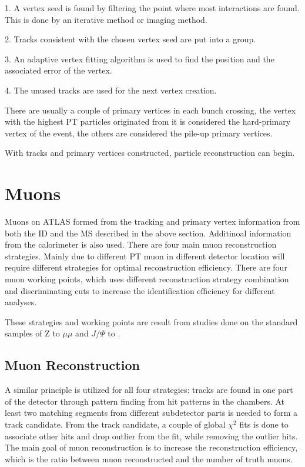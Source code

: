 1. A vertex seed is found by filtering the point where most interactions are found. This is done by an iterative method or imaging method.  

2. Tracks consistent with the chosen vertex seed are put into a group.

3. An adaptive vertex fitting algorithm is used to find the position and the associated error of the vertex. 

4. The unused tracks are used for the next vertex creation. 

There are usually a couple of primary vertices in each bunch crossing, the vertex with the highest PT particles originated from it is considered the hard-primary vertex of the event, the others are considered the pile-up primary vertices. 

With tracks and primary vertices constructed, particle reconstruction can begin. 


\section{Muons}
Muons on ATLAS formed from the tracking and primary vertex information from both the ID and the MS described in the above section. Additinoal information from the calorimeter is also used. There are four main muon reconstruction strategies. Mainly due to different PT muon in different detector location will require different strategies for optimal reconstruction efficiency. There are four muon working points, which uses different reconstruction strategy combination and discriminating cuts to
increase the identification efficiency for different analyses.

These strategies and working points are result from studies done on the standard samples of Z to $\mu \mu $ and $J/\Psi$ to \mu \mu. 

\subsection{Muon Reconstruction}
A similar principle is utilized for all four strategies: tracks are found in one part of the detector through pattern finding from hit patterns in the chambers. At least two matching segments from different subdetector parts is needed to form a track candidate. From the track candidate, a couple of global $\chi^{2}$ fits is done to associate other hits and drop outlier from the fit, while removing the outlier hits. The main goal of muon reconstruction is to increase the
reconstruction efficiency, which is the ratio between muon reconstructed and the number of truth muons. 

